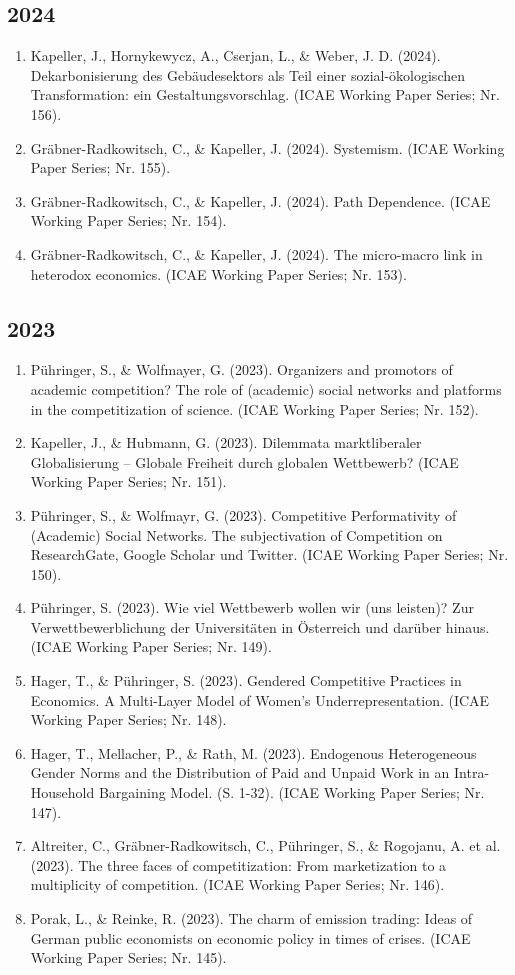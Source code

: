 \subsection*{2024}
\begin{enumerate}
	 \item Kapeller, J., Hornykewycz, A., Cserjan, L., \& Weber, J. D. (2024). Dekarbonisierung des Gebäudesektors als Teil einer sozial-ökologischen Transformation: ein Gestaltungsvorschlag. (ICAE Working Paper Series; Nr. 156).
	 \item Gräbner-Radkowitsch, C., \& Kapeller, J. (2024). Systemism. (ICAE Working Paper Series; Nr. 155).
	 \item Gräbner-Radkowitsch, C., \& Kapeller, J. (2024). Path Dependence. (ICAE Working Paper Series; Nr. 154).
	 \item Gräbner-Radkowitsch, C., \& Kapeller, J. (2024). The micro-macro link in heterodox economics. (ICAE Working Paper Series; Nr. 153).
\end{enumerate}
\subsection*{2023}
\begin{enumerate}
	 \item Pühringer, S., \& Wolfmayer, G. (2023). Organizers and promotors of academic competition? The role of (academic) social networks and platforms in the competitization of science. (ICAE Working Paper Series; Nr. 152).
	 \item Kapeller, J., \& Hubmann, G. (2023). Dilemmata marktliberaler Globalisierung – Globale Freiheit durch globalen Wettbewerb? (ICAE Working Paper Series; Nr. 151).
	 \item Pühringer, S., \& Wolfmayr, G. (2023). Competitive Performativity of (Academic) Social Networks. The subjectivation of Competition on ResearchGate, Google Scholar und Twitter. (ICAE Working Paper Series; Nr. 150).
	 \item Pühringer, S. (2023). Wie viel Wettbewerb wollen wir (uns leisten)? Zur Verwettbewerblichung der Universitäten in Österreich und darüber hinaus. (ICAE Working Paper Series; Nr. 149).
	 \item Hager, T., \& Pühringer, S. (2023). Gendered Competitive Practices in Economics. A Multi-Layer Model of Women’s Underrepresentation. (ICAE Working Paper Series; Nr. 148).
	 \item Hager, T., Mellacher, P., \& Rath, M. (2023). Endogenous Heterogeneous Gender Norms and the Distribution of Paid and Unpaid Work in an Intra-Household Bargaining Model. (S. 1-32). (ICAE Working Paper Series; Nr. 147).
	 \item Altreiter, C., Gräbner-Radkowitsch, C., Pühringer, S., \& Rogojanu, A. et al. (2023). The three faces of competitization: From marketization to a multiplicity of competition. (ICAE Working Paper Series; Nr. 146).
	 \item Porak, L., \& Reinke, R. (2023). The charm of emission trading: Ideas of German public economists on economic policy in times of crises. (ICAE Working Paper Series; Nr. 145).
\end{enumerate}
